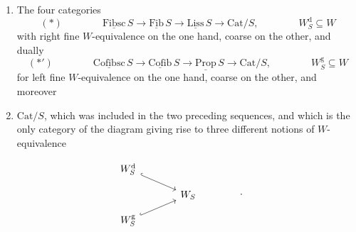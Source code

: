 \documentclass[11pt]{article}
\newcommand{\printedpage}[1]{\marginpar{\footnotesize p.~#1}}
\newcommand{\ul}[1]{\underline{\mathrm{#1}}}
\begin{document}
\begin{enumerate}[label={}]
\item[$1^{o}$)] The four categories
\[(*) \qquad\qquad \ul{Fibsc}\,S \longrightarrow \ul{Fib}\,S \longrightarrow \ul{Liss}\,S \longrightarrow \mathrm{Cat}/S, \qquad\qquad W_S^{\mathrm{d}} \subseteq W\]
with right fine $W$-equivalence on the one hand, coarse on the other, and dually
\[(*') \qquad\qquad \ul{Cofibsc}\,S \longrightarrow \ul{Cofib}\,S \longrightarrow \ul{Prop}\,S \longrightarrow \mathrm{Cat}/S, \qquad\qquad W_S^{\mathrm{g}} \subseteq W\]
for left fine $W$-equivalence on the one hand, coarse on the other, and moreover
\item[$2^{o}$)] $\mathrm{Cat}/S$, which was included in the two preceding sequences, and which is the only category of the diagram giving rise to three different notions of $W$-equivalence %
\end{enumerate}

\[
\begin{tikzcd}[row sep=small, column sep=large]
W_S^{\mathrm{d}} \arrow[dr, hook] & \\
& W_S \\
W_S^{\mathrm{g}} \arrow[ur, hook] &
\end{tikzcd}
\qquad\qquad .
\]

\printedpage{38}
\end{document}
